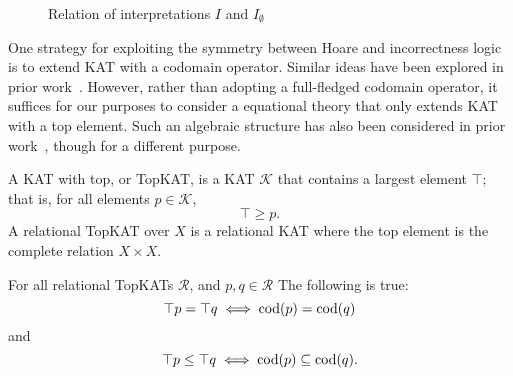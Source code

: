 \begin{figure}
    \centering
    \caption{Relation of interpretations \(I\) and \(I_{\emptyset}\)}\label{fig: proof of KAT cannot encode IL}
\end{figure}

One strategy for exploiting the symmetry between Hoare and incorrectness logic
is to extend KAT with a codomain operator.  Similar ideas have been explored in prior work~\cite{fitzgerald_modal_2016,Fahrenberg_Johansen_Struth_Ziemiánski_2021,desharnais_modal_2004}. However,
rather than adopting a full-fledged codomain operator, it suffices for our
purposes to consider a equational theory that only extends KAT with a top
element.  Such an algebraic structure has also been considered in prior
work~\cite[Section~4]{Mamouras_2017}, though for a different purpose.

\begin{definition}
  A KAT with top, or TopKAT, is a KAT \(𝒦\) that contains a largest
  element \(\top\); that is, for all elements \(p \in 𝒦\),
  \[\top \geq p.\]
  A relational TopKAT over \(X\) is a relational KAT 
  where the top element is the complete relation \(X \times X\).
\end{definition}

\begin{theorem}\label{the: top element can express domain}
    For all relational TopKATs \(ℛ\),
    and \(p, q \in ℛ\) The following is true:
    \[\top p = \top q \iff \operatorname{\mathrm{cod}}(p) = \operatorname{\mathrm{cod}}(q)\]
    and 
    \[\top p \leq \top q \iff \operatorname{\mathrm{cod}}(p) \subseteq \operatorname{\mathrm{cod}}(q).\]
\end{theorem}

